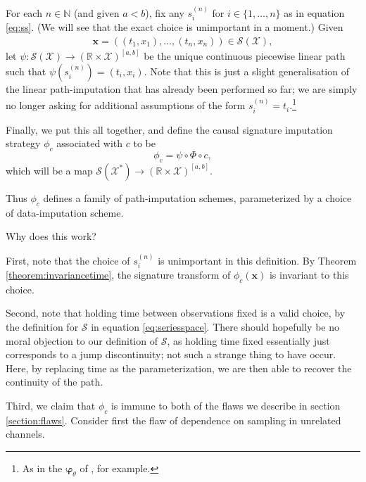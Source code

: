 \documentclass{article}
\newcommand{\reals}{\mathbb{R}}
\newcommand{\naturals}{\mathbb{N}}
\newcommand{\dataspace}{\mathcal{X}}
\newcommand{\seriesspace}{\mathcal{S}}
\begin{document}
For each $n \in \naturals$ (and given $a < b$), fix any $s_i^{(n)}$ for $i \in \{1, \ldots, n \}$ as in equation \eqref{eq:ss}. (We will see that the exact choice is unimportant in a moment.) Given
\begin{align*}
    \mathbf{x} = ((t_1, x_1), \ldots, (t_n, x_n)) \in \seriesspace(\dataspace),
\end{align*}
let $\psi \colon \seriesspace(\dataspace) \to (\reals \times \dataspace)^{[a, b]}$ be the unique continuous piecewise linear path such that $\psi(s_i^{(n)}) = (t_i, x_i)$. Note that this is just a slight generalisation of the linear path-imputation that has already been performed so far; we are simply no longer asking for additional assumptions of the form $s_i^{(n)} = t_i$.\footnote{As in the $\mathbf{\varphi}_\theta$ of \cite{toth2019gp}, for example.}

Finally, we put this all together, and define the causal signature imputation strategy $\phi_c$ associated with $c$ to be
\begin{equation*}
\phi_c = \psi \circ \Phi \circ c,
\end{equation*}
which will be a map $\seriesspace(\dataspace^*) \to (\reals \times \dataspace)^{[a, b]}$.

Thus $\phi_c$ defines a family of path-imputation schemes, parameterized by a choice of data-imputation scheme.

Why does this work?

First, note that the choice of $s_i^{(n)}$ is unimportant in this definition. By Theorem \ref{theorem:invariancetime}, the signature transform of $\phi_c(\mathbf{x})$ is invariant to this choice.

Second, note that holding time between observations fixed is a valid choice, by the definition for $\seriesspace$ in equation \eqref{eq:seriesspace}. There should hopefully be no moral objection to our definition of $\seriesspace$, as holding time fixed essentially just corresponds to a jump discontinuity; not such a strange thing to have occur. Here, by replacing time as the parameterization, we are then able to recover the continuity of the path.

Third, we claim that $\phi_c$ is immune to both of the flaws we describe in section \ref{section:flaws}. Consider first the flaw of dependence on sampling in unrelated channels.
\end{document}
